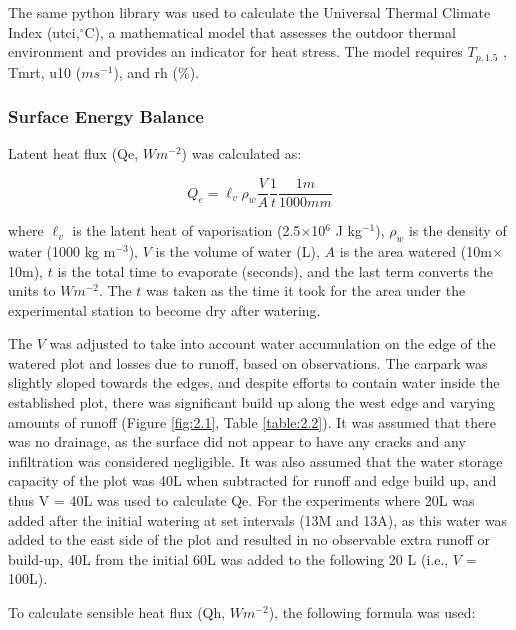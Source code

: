 \documentclass[final,3p,times,authoryear]{elsarticle}
\begin{document}
The same python library was used to calculate the Universal Thermal Climate Index (\gls{utci},$^{\circ}$C), a mathematical model that assesses the outdoor thermal environment and provides an indicator for heat stress. The model requires $T_{p,1.5}$ , \gls{Tmrt}, \gls{u10} ($ms^{-1}$), and \gls{rh} (\%).



\subsubsection{Surface Energy Balance}\label{sec:appendix7.4.5}

Latent heat flux (\gls{Qe}, $Wm^{-2}$) was calculated as:

\begin{equation}
Q_{e} = \ell _{v} \rho_{w} \frac{V}{A} \frac{1}{t} \frac{1m}{1000mm}
\label{eq:7.11}
\end{equation}

where $\ell _{v}$ is the latent heat of vaporisation (2.5$\times$10$^{6}$ J kg$^{-1}$), $\rho_{w}$ is the density of water (1000 kg m$^{-3}$), $V$ is the volume of water (L), $A$ is the area watered (10m$\times$10m), $t$ is the total time to evaporate (seconds), and the last term converts the units to $Wm^{-2}$. The $t$ was taken as the time it took for the area under the experimental station to become dry after watering.

The $V$ was adjusted to take into account water accumulation on the edge of the watered plot and losses due to runoff, based on observations. The carpark was slightly sloped towards the edges, and despite efforts to contain water inside the established plot, there was significant build up along the west edge and varying amounts of runoff (Figure \ref{fig:2.1}, Table \ref{table:2.2}). It was assumed that there was no drainage, as the surface did not appear to have any cracks and any infiltration was considered negligible. It was also assumed that the water storage capacity of the plot was 40L when subtracted for runoff and edge build up, and thus V = 40L was used to calculate \gls{Qe}. For the experiments where 20L was added after the initial watering at set intervals (13M and 13A), as this water was added to the east side of the plot and resulted in no observable extra runoff or build-up, 40L from the initial 60L was added to the following 20 L (i.e., $V$ = 100L).

To calculate sensible heat flux (\gls{Qh}, $Wm^{-2}$), the following formula was used:
\end{document}
